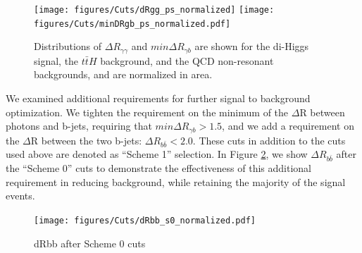 \documentclass{cmspaper}
\begin{document}
\begin{figure}[h]
\centering
\texttt{[image: figures/Cuts/dRgg\_ps\_normalized]}	
\texttt{[image: figures/Cuts/minDRgb\_ps\_normalized.pdf]}	
\caption{Distributions of $\Delta R_{\gamma\gamma}$ and $min\Delta R_{\gamma b}$ are shown for the 
di-Higgs signal, the  $t\bar{t}H$ background, and the QCD non-resonant backgrounds, and are
normalized in area. }
\label{fig:scheme0}
\end{figure}

We examined additional requirements for further signal to background optimization. 
We tighten the requirement on the minimum of the $\Delta$R between photons and b-jets, 
requiring that  $min\Delta R_{\gamma b} > 1.5$, and we add a requirement on
the $\Delta$R between the two b-jets: $\Delta R_{b\bar{b}}<2.0$. These cuts in addition
to the cuts used above are denoted as ``Scheme 1'' selection. 
In Figure \ref{fig:dRbb_s0}, we show $\Delta R_{b\bar{b}}$ after the ``Scheme 0'' cuts 
to demonstrate the effectiveness of this additional requirement in reducing background, while
retaining the majority of the signal events. 

\begin{figure}
\centering
\texttt{[image: figures/Cuts/dRbb\_s0\_normalized.pdf]}	
\caption{dRbb after Scheme 0 cuts}
\label{fig:dRbb_s0}
\end{figure}
\end{document}
